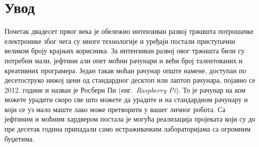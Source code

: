 \documentclass[12pt,oneside]{memoir}
\theoremstyle{remark}
\begin{document}
\frontmatter
\naslovna
\komisija
\apstrakt
\tableofcontents*

\mainmatter

\chapter{Увод}
\label{chp:uvod}
Почетак двадесет првог века је обележио интензиван развој тржишта потрошачке електронике због чега су многе технологије и уређаји постали приступачни великом броју крајњих корисника. За интензиван развој овог тржишта били су потребни мали, јефтини али опет моћни рачунари и већи број талентованих и креативних програмера. Један такав моћан рачунар опште намене, доступан по десетоструко нижој цени од стандардног десктоп или лаптоп рачунара, појавио се 2012. године и назван је Росбери Пи (енг.~{\em Raspberry Pi}). То је рачунар на ком можете урадити скоро све што можете да урадите и на стандардном рачунару и који се уз мало маште лако може претворити у вашег личног робота. Са јефтиним и моћним хардвером постала је могућа реализација пројеката који су до пре десетак година припадали само истраживачким лабораторијама са огромним буџетима.
\end{document}
